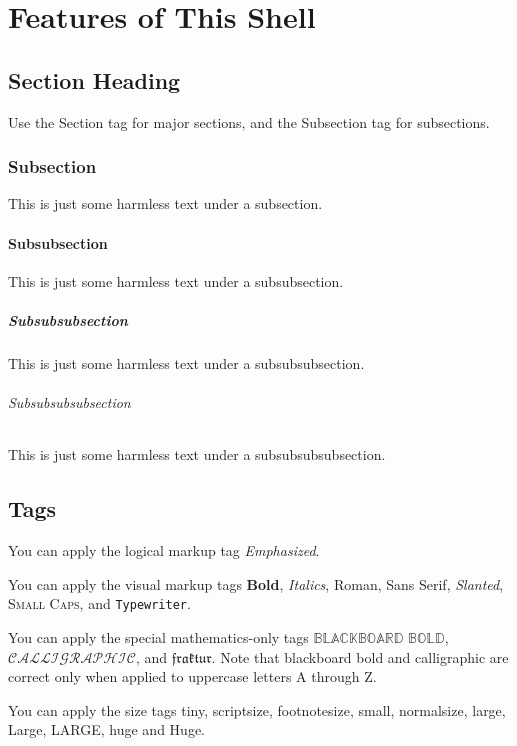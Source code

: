 \documentclass{book}%
\begin{document}
\chapter{Features of This Shell}

\section{Section Heading}

Use the Section tag for major sections, and the Subsection tag for subsections.

\subsection{Subsection}

This is just some harmless text under a subsection.

\subsubsection{Subsubsection}

This is just some harmless text under a subsubsection.

\paragraph{Subsubsubsection}

This is just some harmless text under a subsubsubsection.

\subparagraph{Subsubsubsubsection}

This is just some harmless text under a subsubsubsubsection.

\section{Tags}

You can apply the logical markup tag \emph{Emphasized}.

You can apply the visual markup tags \textbf{Bold}, \textit{Italics},
\textrm{Roman}, \textsf{Sans Serif}, \textsl{Slanted}, \textsc{Small Caps},
and \texttt{Typewriter}.

You can apply the special mathematics-only tags $\mathbb{BLACKBOARD}$
$\mathbb{BOLD}$, $\mathcal{CALLIGRAPHIC}$, and $\mathfrak{fraktur}$. Note that
blackboard bold and calligraphic are correct only when applied to uppercase
letters A through Z.

You can apply the size tags {\tiny tiny}, {\scriptsize scriptsize},
{\footnotesize footnotesize}, {\small small}, {\normalsize normalsize},
{\large large}, {\Large Large}, {\LARGE LARGE}, {\huge huge} and {\Huge Huge}.
\end{document}
